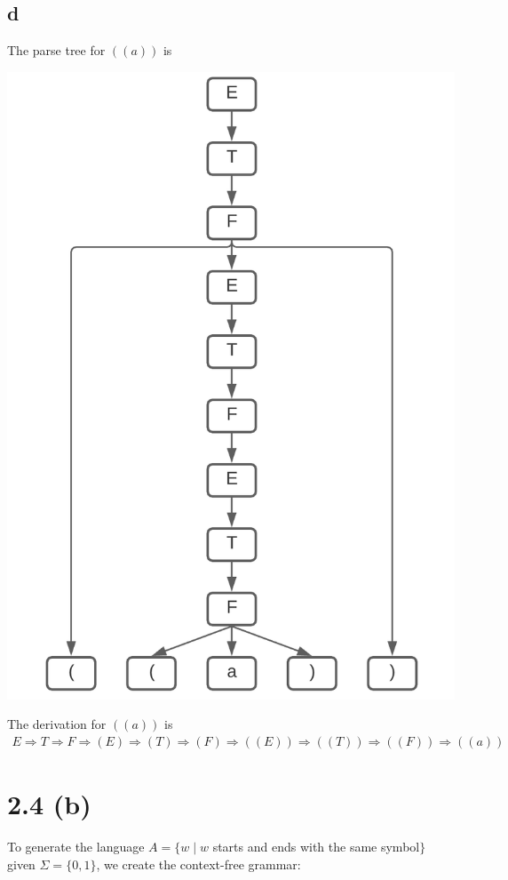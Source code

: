 \documentclass{article}
\begin{document}
\subsection*{d}
The parse tree for $((a))$ is
\begin{center}
    \includegraphics[scale=.65]{2.1.d.png}
\end{center}
The derivation for $((a))$ is
\begin{align*}
    E \Rightarrow T \Rightarrow F \Rightarrow(E) \Rightarrow (T) \Rightarrow (F) \Rightarrow ((E)) \Rightarrow ((T)) \Rightarrow ((F)) \Rightarrow((a))
\end{align*}

\pagebreak

\section*{2.4 (b)}
    To generate the language $A = \{w \mid w$ starts and ends with the same symbol$\}$ given $\Sigma = \{0, 1\}$, we create the context-free grammar:
    
\end{document}
